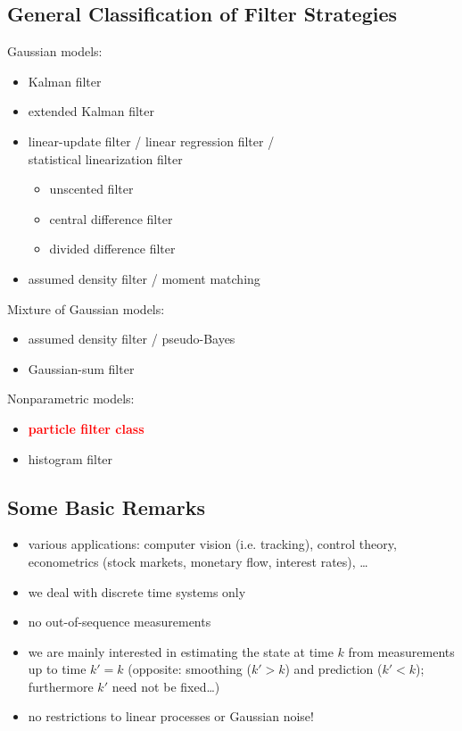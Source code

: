 \documentclass[english,pdftex]{article}
\begin{document}
\newpage
\subsection{General Classification of %
Filter Strategies}

Gaussian models:
\begin{itemize}
   \item Kalman filter
   \item extended Kalman filter
   \item linear-update filter / linear regression filter /\\
      statistical linearization filter
   \begin{itemize}
      \item unscented filter
      \item central difference filter
      \item divided difference filter
   \end{itemize}
   \item assumed density filter / moment matching
\end{itemize}

\newpage
Mixture of Gaussian models:
\begin{itemize}
   \item assumed density filter / pseudo-Bayes
   \item Gaussian-sum filter
\end{itemize}

\bigskip
Nonparametric models:
\begin{itemize}
   \item \textcolor{red}{\bfseries particle filter class}
   \item histogram filter
\end{itemize}


\newpage
\subsection{Some Basic Remarks}

\begin{itemize}
  \item various applications: computer vision (i.e. tracking),
  control theory, econometrics (stock markets, monetary flow, interest
  rates), \dots
  \item we deal with discrete time systems only
  \item no out-of-sequence measurements
  \item we are mainly interested in estimating the state at time
  $k$ from measurements up to time $k'=k$ (opposite: smoothing
  ($k'>k$) and prediction ($k'<k$); furthermore $k'$ need not be
  fixed\dots)
  \item no restrictions to linear processes or Gaussian noise!
\end{itemize}
\end{document}
